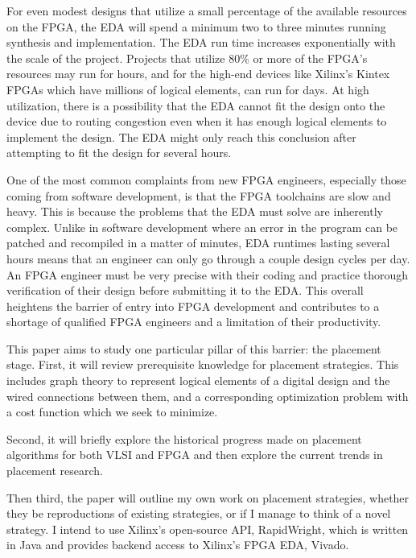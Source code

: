 \documentclass{article}
\begin{document}
For even modest designs that utilize a small percentage of the available resources on the FPGA, the EDA will spend a minimum two to three minutes running synthesis and implementation.
The EDA run time increases exponentially with the scale of the project. 
Projects that utilize 80\% or more of the FPGA's resources may run for hours, and for the high-end devices like Xilinx's Kintex FPGAs which have millions of logical elements, can run for days.
At high utilization, there is a possibility that the EDA cannot fit the design onto the device due to routing congestion even when it has enough logical elements to implement the design. 
The EDA might only reach this conclusion after attempting to fit the design for several hours. 

One of the most common complaints from new FPGA engineers, especially those coming from software development, is that the FPGA toolchains are slow and heavy.
This is because the problems that the EDA must solve are inherently complex.
Unlike in software development where an error in the program can be patched and recompiled in a matter of minutes, EDA runtimes lasting several hours means that an engineer can only go through a couple design cycles per day. 
An FPGA engineer must be very precise with their coding and practice thorough verification of their design before submitting it to the EDA.
This overall heightens the barrier of entry into FPGA development and contributes to a shortage of qualified FPGA engineers and a limitation of their productivity. 

This paper aims to study one particular pillar of this barrier: the placement stage. 
First, it will review prerequisite knowledge for placement strategies. 
This includes graph theory to represent logical elements of a digital design and the wired connections between them, and a corresponding optimization problem with a cost function which we seek to minimize. 

Second, it will briefly explore the historical progress made on placement algorithms for both VLSI and FPGA and then explore the current trends in placement research. 

Then third, the paper will outline my own work on placement strategies, whether they be reproductions of existing strategies, or if I manage to think of a novel strategy. 
I intend to use Xilinx's open-source API, RapidWright, which is written in Java and provides backend access to Xilinx's FPGA EDA, Vivado.
\end{document}
